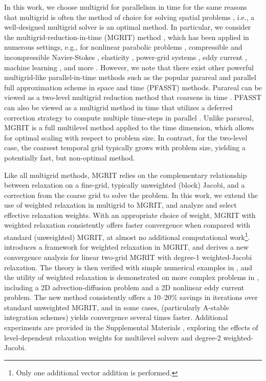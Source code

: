 \documentclass[VANCOUVER,STIX1COL]{WileyNJD-v2}
\begin{document}
In this work, we choose multigrid for parallelism in time for the same reasons that multigrid is often the method of choice for solving spatial problems \cite{TrOo2001,BrHeMc2000}, i.e., a well-designed multigrid solver is an optimal method.  In particular, we consider the multigrid-reduction-in-time (MGRIT) method \cite{Fa2014}, which has been applied in numerous settings, e.g., for nonlinear parabolic problems \cite{Fa2016}, compressible and incompressible Navier-Stokes \cite{FalKatz2014,ChrGaGuFaSc2019b}, elasticity \cite{HeNoRoSc2017}, power-grid systems \cite{LeFaWoTo2016,GuFaToWoSc2020}, eddy current \cite{FrHaKuSc2018,BoFrHaSc2020}, machine learning \cite{GuRuScCyGa2018,CyGuSc2019}, and more \cite{OnSc2019}.
However, we note that there exist other powerful multigrid-like parallel-in-time methods such as the popular parareal 
\cite{LiMaTu2001} and parallel full approximation scheme in space and time (PFASST) \cite{MiWi2008,EmMi2012,Mi2010} methods. Parareal can be viewed as a two-level multigrid reduction method that coarsens in time \cite{gander2007analysis}. PFASST can also be viewed as a multigrid 
method in time that utilizes a deferred correction strategy to compute multiple time-steps in parallel \cite{bolten2017multigrid}.   Unlike parareal, MGRIT is a full multilevel method applied to the time dimension, which allows for optimal scaling with respect to problem size.  In contrast, for the two-level case, the coarsest temporal grid typically grows with problem size, yielding a potentially fast, but non-optimal method.

Like all multigrid methods, MGRIT relies on the complementary relationship between relaxation on a fine-grid, typically unweighted (block) Jacobi, and a correction from the coarse grid to solve the problem. 
In this work, we extend the use of weighted relaxation in multigrid \cite{AdBrHuTu2003,BaFaKoYa2011,TrOo2001,BrHeMc2000} to MGRIT, and analyze and select effective relaxation weights. With an appropriate choice of weight, MGRIT with weighted relaxation consistently offers faster convergence when compared with standard (unweighted) MGRIT, at almost no additional computational work\footnote{Only one additional vector addition is performed.}.  introduces a framework for weighted relaxation in MGRIT, and derives a new convergence analysis for linear two-grid MGRIT with degree-1 weighted-Jacobi relaxation. The theory is then verified with simple numerical examples in , and the utility of weighted relaxation is demonstrated on more complex problems in , including a 2D advection-diffusion problem and a 2D nonlinear eddy current problem. The new method consistently offers a 10--20\% savings in iterations over standard unweighted MGRIT, and in some cases, (particularly A-stable integration schemes) yields convergence several times faster. Additional experiments are provided in the Supplemental Materials , exploring the effects of level-dependent relaxation weights for multilevel solvers and degree-2 weighted-Jacobi.
\end{document}

